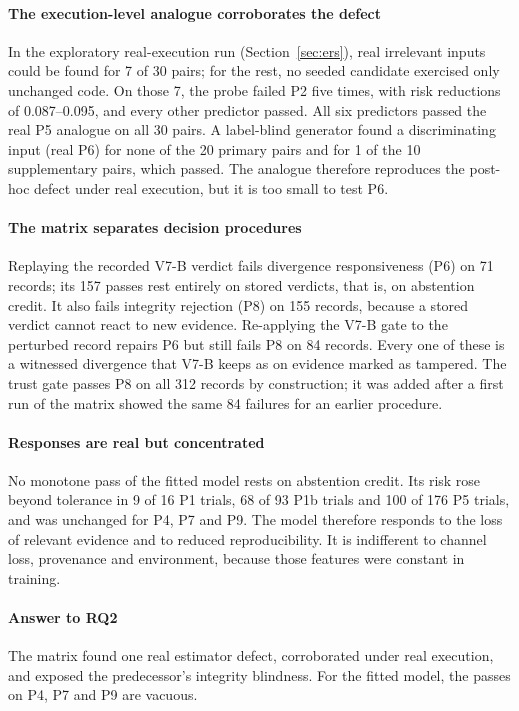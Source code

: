 \paragraph*{The execution-level analogue corroborates the defect} In the exploratory real-execution run (Section~\ref{sec:ers}), real irrelevant inputs could be found for 7 of 30 pairs; for the rest, no seeded candidate exercised only unchanged code. On those 7, the probe failed P2 five times, with risk reductions of 0.087--0.095, and every other predictor passed. All six predictors passed the real P5 analogue on all 30 pairs. A label-blind generator found a discriminating input (real P6) for none of the 20 primary pairs and for 1 of the 10 supplementary pairs, which passed. The analogue therefore reproduces the post-hoc defect under real execution, but it is too small to test P6.

\paragraph*{The matrix separates decision procedures} Replaying the recorded V7-B verdict fails divergence responsiveness (P6) on 71 records; its 157 passes rest entirely on stored \INS{} verdicts, that is, on abstention credit. It also fails integrity rejection (P8) on 155 records, because a stored verdict cannot react to new evidence. Re-applying the V7-B gate to the perturbed record repairs P6 but still fails P8 on 84 records. Every one of these is a witnessed divergence that V7-B keeps as \DIV{} on evidence marked as tampered. The \sbg{} trust gate passes P8 on all 312 records by construction; it was added after a first run of the matrix showed the same 84 failures for an earlier \sbg{} procedure.

\paragraph*{Responses are real but concentrated} No monotone pass of the fitted model rests on abstention credit. Its risk rose beyond tolerance in 9 of 16 P1 trials, 68 of 93 P1b trials and 100 of 176 P5 trials, and was unchanged for P4, P7 and P9. The model therefore responds to the loss of relevant evidence and to reduced reproducibility. It is indifferent to channel loss, provenance and environment, because those features were constant in training.

\paragraph*{Answer to RQ2} The matrix found one real estimator defect, corroborated under real execution, and exposed the predecessor's integrity blindness. For the fitted model, the passes on P4, P7 and P9 are vacuous.

